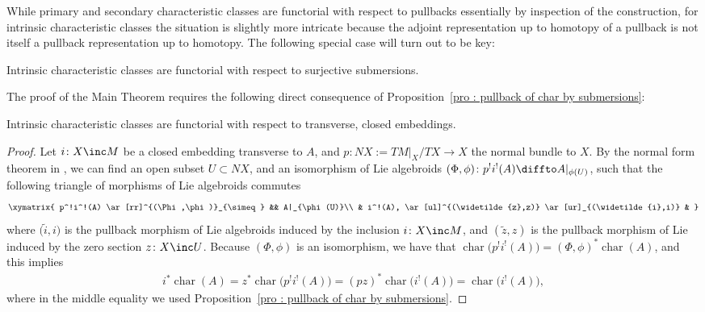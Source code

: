 While primary and secondary characteristic classes are functorial with respect to pullbacks essentially by inspection of the construction, for intrinsic characteristic classes the situation is slightly more intricate because the adjoint representation up to homotopy of a pullback is not itself a pullback representation up to homotopy. The following special case will turn out to be key:

\begin{proposition}\label{pro : pullback of char by submersions}
 Intrinsic characteristic classes are functorial with respect to surjective submersions.
\end{proposition}

The proof of the Main Theorem requires the following direct consequence of Proposition~\ref{pro : pullback of char by submersions}:

\begin{proposition}\label{pro : pullback of char by inclusion}
 Intrinsic characteristic classes are functorial with respect to transverse, closed embeddings.
\end{proposition}
\begin{proof}Let $i\colon X \inc M$ be a closed embedding transverse to $A$, and $p\colon NX:=TM|_X/TX \to X$ the normal bundle to $X$. By the normal form theorem in \cite{BLM}, we can find an open subset $U \subset NX$, and an isomorphism of Lie algebroids $(\Phi,\phi) \colon p^!i^!(A) \diffto A|_{\phi(U)}$, such that the following triangle of morphisms of Lie algebroids commutes
\begin{gather*}
 \xymatrix{
 p^!i^!(A) \ar[rr]^{(\Phi,\phi)}_{\simeq} && A|_{\phi(U)}\\
 & i^!(A), \ar[ul]^{(\widetilde{z},z)} \ar[ur]_{(\widetilde{i},i)} &
 }
\end{gather*}where $\big(\widetilde{i},i\big)$ is the pullback morphism of Lie algebroids induced by the inclusion $i\colon X \inc M$, and $(\widetilde{z},z)$ is the pullback morphism of Lie induced by the zero section $z\colon X \inc U$. Because $(\Phi,\phi)$ is an isomorphism, we have that $\operatorname{char}\big(p^!i^!(A)\big) = (\Phi,\phi)^*\operatorname{char}(A)$, and this implies
\begin{gather*}
 i^*\operatorname{char}(A) = z^*\operatorname{char}\big(p^!i^!(A)\big) =(pz)^*\operatorname{char}\big(i^!(A)\big) = \operatorname{char}\big(i^!(A)\big),
\end{gather*}where in the middle equality we used Proposition~\ref{pro : pullback of char by submersions}.
\end{proof}

